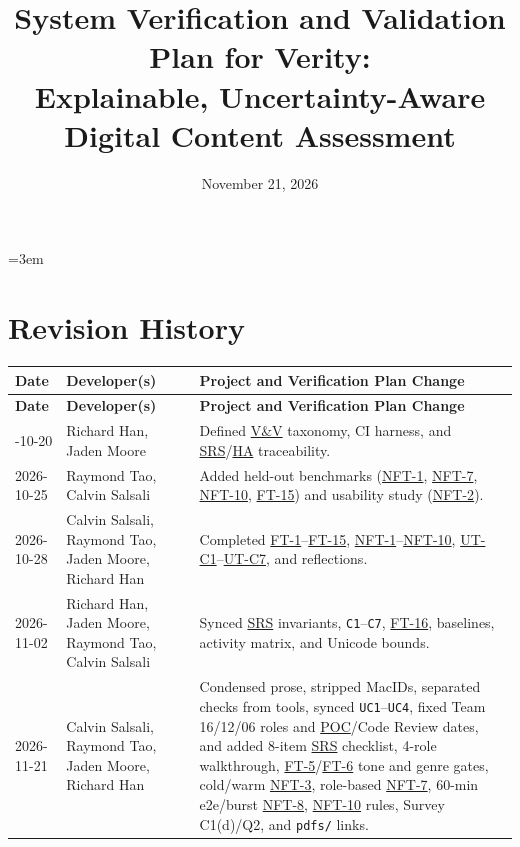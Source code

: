 \documentclass[12pt, titlepage]{article}
\title{System Verification and Validation Plan for Verity:\\Explainable, Uncertainty-Aware Digital Content Assessment\\\progname{}}
\author{\authname}
\date{November 21, 2026}
\newcommand{\HA}{\hyperlink{vnv-acr-ha}{HA}}
\newcommand{\POC}{\hyperlink{vnv-acr-poc}{POC}}
\newcommand{\SRS}{\hyperlink{vnv-acr-srs}{SRS}}
\newcommand{\VnV}{\hyperlink{vnv-acr-vnv}{V\&V}}
\begin{document}
\emergencystretch=3em

\hypersetup{pageanchor=false}
\maketitle
\thispagestyle{empty}

\newpage
\hypersetup{pageanchor=true}

\section*{Revision History}

\begingroup\small
\renewcommand{\arraystretch}{0.95}
\setlength{\tabcolsep}{4pt}
\begin{tabularx}{\textwidth}{l P{3.6cm} Y}
\caption{Revision History} \label{TblVnVRevisionHistory}\\
\toprule
\textbf{Date} & \textbf{Developer(s)} & \textbf{Project and Verification Plan Change}\\
\midrule
\endfirsthead
\toprule
\textbf{Date} & \textbf{Developer(s)} & \textbf{Project and Verification Plan Change}\\
\midrule
\endhead
\bottomrule
{}-10-20 & Richard Han, Jaden Moore & Defined \VnV{} taxonomy, CI harness, and \SRS{}/\HA{} traceability.\\
2026-10-25 & Raymond Tao, Calvin Salsali & Added held-out benchmarks (\hyperref[test:NFT-1]{NFT-1}, \hyperref[test:NFT-7]{NFT-7}, \hyperref[test:NFT-10]{NFT-10}, \hyperref[test:FT-15]{FT-15}) and usability study (\hyperref[test:NFT-2]{NFT-2}).\\
2026-10-28 & Calvin Salsali, Raymond Tao, Jaden Moore, Richard Han & Completed \hyperref[test:FT-1]{FT-1}--\hyperref[test:FT-15]{FT-15}, \hyperref[test:NFT-1]{NFT-1}--\hyperref[test:NFT-10]{NFT-10}, \hyperref[ut:C1]{UT-C1}--\hyperref[ut:C7]{UT-C7}, and reflections.\\
2026-11-02 & Richard Han, Jaden Moore, Raymond Tao, Calvin Salsali & Synced \SRS{} invariants, \texttt{C1}--\texttt{C7}, \hyperref[test:FT-16]{FT-16}, baselines, activity matrix, and Unicode bounds.\\
2026-11-21 & Calvin Salsali, Raymond Tao, Jaden Moore, Richard Han & Condensed prose, stripped MacIDs, separated checks from tools, synced \texttt{UC1}--\texttt{UC4}, fixed Team 16/12/06 roles and \POC{}/Code Review dates, and added 8-item \SRS{} checklist, 4-role walkthrough, \hyperref[test:FT-5]{FT-5}/\hyperref[test:FT-6]{FT-6} tone and genre gates, cold/warm \hyperref[test:NFT-3]{NFT-3}, role-based \hyperref[test:NFT-7]{NFT-7}, 60-min e2e/burst \hyperref[test:NFT-8]{NFT-8}, \hyperref[test:NFT-10]{NFT-10} rules, Survey C1(d)/Q2, and \texttt{pdfs/} links.\\
\end{tabularx}
\endgroup
\end{document}
